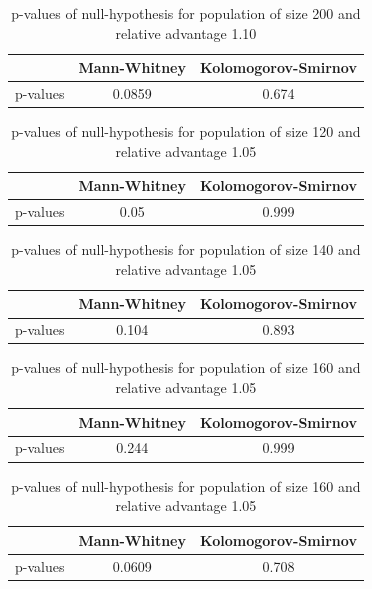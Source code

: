 \documentclass{l4proj}
\begin{document}
\begin{table}[]
    \centering
    \begin{tabular}{|c|c|c|}
    \hline
    & Mann-Whitney & Kolomogorov-Smirnov \\ \hline
    p-values & 0.0859 & 0.674 \\ \hline
    \end{tabular}
    \caption{p-values of null-hypothesis for population of size 200 and relative advantage 1.10}
\end{table}

\begin{table}[]
    \centering
    \begin{tabular}{|c|c|c|}
    \hline
    & Mann-Whitney & Kolomogorov-Smirnov \\ \hline
    p-values & 0.05 & 0.999 \\ \hline
    \end{tabular}
    \caption{p-values of null-hypothesis for population of size 120 and relative advantage 1.05}
\end{table}


\begin{table}[]
    \centering
    \begin{tabular}{|c|c|c|}
    \hline
    & Mann-Whitney & Kolomogorov-Smirnov \\ \hline
    p-values & 0.104 & 0.893 \\ \hline
    \end{tabular}
    \caption{p-values of null-hypothesis for population of size 140 and relative advantage 1.05}
\end{table}


\begin{table}[]
    \centering
    \begin{tabular}{|c|c|c|}
    \hline
    & Mann-Whitney & Kolomogorov-Smirnov \\ \hline
    p-values & 0.244 & 0.999  \\ \hline
    \end{tabular}
    \caption{p-values of null-hypothesis for population of size 160 and relative advantage 1.05}
\end{table}

\begin{table}[]
    \centering
    \begin{tabular}{|c|c|c|}
    \hline
    & Mann-Whitney & Kolomogorov-Smirnov \\ \hline
    p-values & 0.0609 & 0.708  \\ \hline
    \end{tabular}
    \caption{p-values of null-hypothesis for population of size 160 and relative advantage 1.05}
\end{table}
\end{document}
